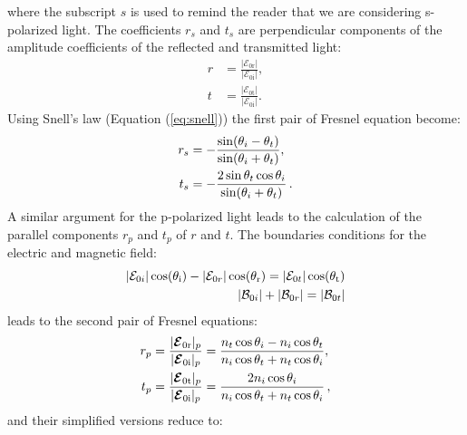 where the subscript $s$ is used to remind the reader that we are considering s-polarized light. The coefficients $r_s$ and $t_s$ are perpendicular components of the amplitude coefficients of the reflected and transmitted light:
\begin{equation}
\begin{split}
r & =\frac{|\boldsymbol{\mathcal{E}}_{0 \textrm{r}}|}{|\boldsymbol{\mathcal{E}}_{0\textrm{i}}|}, \\
t & =\frac{|\boldsymbol{\mathcal{E}}_{0 \textrm{t}}|}{|\boldsymbol{\mathcal{E}}_{0\textrm{i}}|}.
\end{split}
\end{equation}
Using Snell's law (Equation (\ref{eq:snell})) the first pair of Fresnel equation become:
\begin{equation} \label{simple_Fresnel}
\begin{split}
r_{s} & = -\frac{\sin(\theta_i-\theta_t)}{\sin(\theta_i+\theta_t)},\\
t_{s} & = -\frac{2\sin \theta_t \cos \theta_i}{\sin(\theta_i+\theta_t)}\,.
\end{split}
\end{equation}
\indent A similar argument for the p-polarized light leads to the calculation of the parallel components $r_p$ and $t_p$ of $r$ and $t$. 
The boundaries conditions for the electric and magnetic field:
\begin{subequations}
\begin{align}
|\mathcal{E}_{0 i}|\cos(\theta_{\textrm{i}}) - |\mathcal{E}_{0 r}|\cos(\theta_{\textrm{r}}) = |\mathcal{E}_{0 t}|\cos(\theta_{\textrm{t}})\\
|\mathcal{B}_{0 i}| + |\mathcal{B}_{0 r}| = |\mathcal{B}_{0 t}|
\end{align}
\end{subequations}
leads to the second pair of Fresnel equations:
\begin{equation}\label{Fresnel_parallel}
\begin{split}
r_{p} & = \frac{|\boldsymbol{\mathcal{E}}_{0 \textrm{r}}|_{p}}{|\boldsymbol{\mathcal{E}}_{0\textrm{i}}|_p} = \frac{n_t\cos\theta_i-n_i \cos\theta_t}{n_i \cos\theta_t+n_t\cos\theta_i},\\
t_{p} & =\frac{|\boldsymbol{\mathcal{E}}_{0 \textrm{t}}|_{p}}{|\boldsymbol{\mathcal{E}}_{0\textrm{i}}|_p} =  \frac{2n_i\cos\theta_i}{n_i\cos\theta_t+n_t\cos\theta_i}\,,
\end{split}
\end{equation}
and their simplified versions reduce to:
